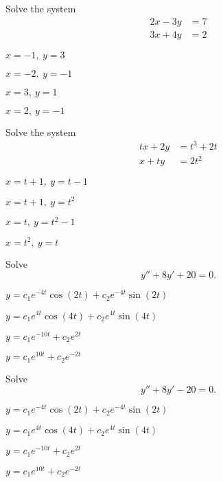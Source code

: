 \begin{readinessAssuranceTest}
\setcounter{enumi}{20}

\item
Solve the system 
\begin{alignat*}{2}
2x-3y&= 7 \\
3x+4y&= 2
\end{alignat*}
\begin{multicols}{4}
\begin{readinessAssuranceTestChoices}
\item \(x=-1,\ y=3\)
\item \(x=-2,\ y=-1\)
\item \(x=3,\ y=1\)
\item \(x=2,\ y=-1\) %
\end{readinessAssuranceTestChoices}
\end{multicols}
\vfill

\item
Solve the system
\begin{alignat*}{2}
tx+2y&=t^3+2t \\
x+ty&= 2t^2
\end{alignat*}
\begin{multicols}{4}
\begin{readinessAssuranceTestChoices}
\item \(x=t+1,\ y=t-1\)
\item \(x=t+1,\ y=t^2\)
\item \(x=t,\ y=t^2-1\)
\item \(x=t^2,\ y=t\) %
\end{readinessAssuranceTestChoices}
\end{multicols}
\vfill

\item
Solve \[y''+8y'+20 = 0.\]
\begin{multicols}{2}
\begin{readinessAssuranceTestChoices}
\item \(y=c_1 e^{-4t}\cos(2t)+c_2e^{-4t}\sin(2t)\) %
\item \(y=c_1 e^{4t}\cos(4t)+c_2e^{4t}\sin(4t)\) 
\item \(y=c_1 e^{-10t}+c_2 e^{2t}\)
\item \(y=c_1 e^{10t}+c_2 e^{-2t}\)
\end{readinessAssuranceTestChoices}
\end{multicols}
\vfill
\item
Solve \[y''+8y'-20 = 0.\]
\begin{multicols}{2}
\begin{readinessAssuranceTestChoices}
\item \(y=c_1 e^{-4t}\cos(2t)+c_2e^{-4t}\sin(2t)\) 
\item \(y=c_1 e^{4t}\cos(4t)+c_2e^{4t}\sin(4t)\) 
\item \(y=c_1 e^{-10t}+c_2 e^{2t}\)%
\item \(y=c_1 e^{10t}+c_2 e^{-2t}\)
\end{readinessAssuranceTestChoices}
\end{multicols}


\end{readinessAssuranceTest}
